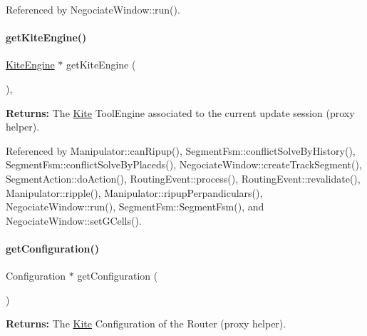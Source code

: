 Referenced by Negociate\+Window\+::run().

\mbox{\label{classKite_1_1Session_a7b6c91acd2c2a7c082b3b006c1bdc91d}} 
\paragraph{\texorpdfstring{get\+Kite\+Engine()}{getKiteEngine()}}
{\footnotesize\ttfamily \mbox{\hyperlink{classKite_1_1KiteEngine}{Kite\+Engine}} $\ast$ get\+Kite\+Engine (\begin{DoxyParamCaption}{ }\end{DoxyParamCaption})\hspace{0.3cm}{\ttfamily [inline]}, {\ttfamily [static]}}

{\bfseries Returns\+:} The \mbox{\hyperlink{namespaceKite}{Kite}} Tool\+Engine associated to the current update session (proxy helper). 

Referenced by Manipulator\+::can\+Ripup(), Segment\+Fsm\+::conflict\+Solve\+By\+History(), Segment\+Fsm\+::conflict\+Solve\+By\+Placeds(), Negociate\+Window\+::create\+Track\+Segment(), Segment\+Action\+::do\+Action(), Routing\+Event\+::process(), Routing\+Event\+::revalidate(), Manipulator\+::ripple(), Manipulator\+::ripup\+Perpandiculars(), Negociate\+Window\+::run(), Segment\+Fsm\+::\+Segment\+Fsm(), and Negociate\+Window\+::set\+G\+Cells().

\mbox{\label{classKite_1_1Session_a9a7fbadfe526875680f698c76adfb128}} 
\paragraph{\texorpdfstring{get\+Configuration()}{getConfiguration()}}
{\footnotesize\ttfamily Configuration $\ast$ get\+Configuration (\begin{DoxyParamCaption}{ }\end{DoxyParamCaption})\hspace{0.3cm}{\ttfamily [static]}}

{\bfseries Returns\+:} The \mbox{\hyperlink{namespaceKite}{Kite}} Configuration of the Router (proxy helper). \mbox{\label{classKite_1_1Session_aef6f41b0e8265ad574d1797f46ab9fa8}} 
